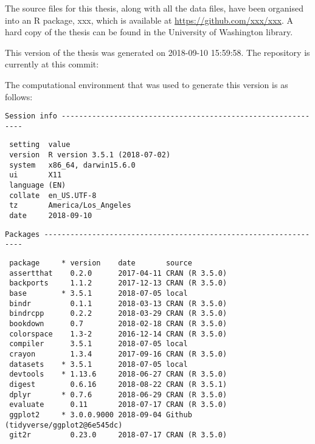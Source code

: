 \documentclass[twoside,12pt,final]{ucthesis-CA2012} %
\begin{document}
\begin{ucmainmatter}
The source files for this thesis, along with all the data files, have
been organised into an R package, xxx, which is available at
\url{https://github.com/xxx/xxx}. A hard copy of the thesis can be found
in the University of Washington library.

This version of the thesis was generated on 2018-09-10 15:59:58. The
repository is currently at this commit:

The computational environment that was used to generate this version is
as follows:
\begin{verbatim}
Session info -------------------------------------------------------------
\end{verbatim}
\begin{verbatim}
 setting  value                       
 version  R version 3.5.1 (2018-07-02)
 system   x86_64, darwin15.6.0        
 ui       X11                         
 language (EN)                        
 collate  en_US.UTF-8                 
 tz       America/Los_Angeles         
 date     2018-09-10                  
\end{verbatim}
\begin{verbatim}
Packages -----------------------------------------------------------------
\end{verbatim}
\begin{verbatim}
 package     * version    date       source                               
 assertthat    0.2.0      2017-04-11 CRAN (R 3.5.0)                       
 backports     1.1.2      2017-12-13 CRAN (R 3.5.0)                       
 base        * 3.5.1      2018-07-05 local                                
 bindr         0.1.1      2018-03-13 CRAN (R 3.5.0)                       
 bindrcpp      0.2.2      2018-03-29 CRAN (R 3.5.0)                       
 bookdown      0.7        2018-02-18 CRAN (R 3.5.0)                       
 colorspace    1.3-2      2016-12-14 CRAN (R 3.5.0)                       
 compiler      3.5.1      2018-07-05 local                                
 crayon        1.3.4      2017-09-16 CRAN (R 3.5.0)                       
 datasets    * 3.5.1      2018-07-05 local                                
 devtools    * 1.13.6     2018-06-27 CRAN (R 3.5.0)                       
 digest        0.6.16     2018-08-22 CRAN (R 3.5.1)                       
 dplyr       * 0.7.6      2018-06-29 CRAN (R 3.5.0)                       
 evaluate      0.11       2018-07-17 CRAN (R 3.5.0)                       
 ggplot2     * 3.0.0.9000 2018-09-04 Github (tidyverse/ggplot2@6e545dc)   
 git2r         0.23.0     2018-07-17 CRAN (R 3.5.0)                       

\end{verbatim}
\end{ucmainmatter}
\end{document}
